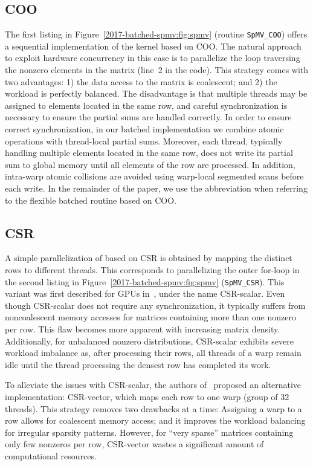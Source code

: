 \subsection{COO}
The first listing 
in Figure~\ref{2017-batched-spmv:fig:spmv} (routine {\tt SpMV\_COO}) offers a sequential implementation 
of the \spmv kernel based on COO.
The natural approach to exploit hardware concurrency in this case
is to parallelize the loop traversing the nonzero elements in the matrix
(line~2 in the code). 
This strategy comes with two advantages: 1) the data access to the matrix
is coalescent; and
2) the workload
is perfectly balanced.
The disadvantage
is that multiple threads
may be assigned to elements located in the same row, and careful synchronization 
is necessary to ensure the partial sums are handled correctly. 
In order
to ensure correct synchronization,
in our batched implementation we combine atomic operations 
with thread-local partial sums. Moreover, each thread, typically handling multiple elements
located in the same row, does not write its partial sum to global memory until
all elements of the row are processed.
In addition, intra-warp atomic collisions are avoided
using warp-local segmented scans before each write.
In the remainder of the paper, we use the abbreviation \coo when referring to the
flexible batched \spmv routine based on COO.

\subsection{CSR}
A simple parallelization of \spmv based on CSR 
is obtained by mapping the distinct rows to different threads.
This corresponds to parallelizing the outer for-loop in the second listing
in Figure~\ref{2017-batched-spmv:fig:spmv} ({\tt SpMV\_CSR}).
This variant was first described for GPUs in~\cite{ellpack},
under the name CSR-scalar.
Even though CSR-scalar does not require any synchronization,
it typically suffers from noncoalescent memory accesses
for matrices containing more than one nonzero per row.
This flaw becomes more apparent with increasing matrix density.
Additionally, for unbalanced nonzero distributions,
CSR-scalar exhibits severe workload imbalance as,
after processing their rows, 
all threads of a warp remain idle until the thread processing 
the densest row has completed its work.

To alleviate the issues with CSR-scalar, the authors of~\cite{ellpack}
proposed an alternative implementation: CSR-vector, which
maps each row to one warp (group of 32 threads).
This strategy removes two drawbacks at a time:
Assigning a warp to a row allows for coalescent memory access;
and it improves the workload balancing for irregular sparsity patterns.
However, for ``very sparse'' matrices containing only few nonzeros per row,
CSR-vector wastes a significant amount of computational resources.

